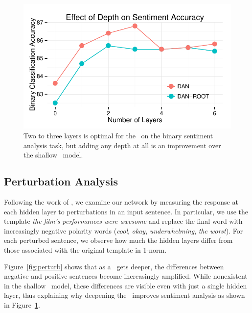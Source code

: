 \begin{figure}[t!]
\includegraphics[scale=0.6]{2015_acl_dan/figures/layers.pdf}
  \caption{Two to three layers is optimal for the \dan\ on the  binary sentiment
          analysis task, but adding any depth at all is an improvement over the
          shallow \nbow\ model.}
\label{fig:slayers}
\end{figure}









\subsection{Perturbation Analysis}

Following the work of , we examine our network by measuring
the response at each hidden layer to perturbations in an input sentence. In
particular, we use the template \emph{the film's performances were awesome} and
replace the final word with increasingly negative polarity words (\emph{cool},
\emph{okay}, \emph{underwhelming}, \emph{the worst}). For each perturbed
sentence, we observe how much the hidden layers differ from those associated
with the original template in 1-norm.

Figure~\ref{fig:perturb} shows that as a \dan\ gets deeper, the differences
between negative and positive sentences become increasingly amplified. While
nonexistent in the shallow \nbow\ model, these differences are visible even with
just a single hidden layer, thus explaining why deepening the \nbow\ improves
sentiment analysis as shown in Figure~\ref{fig:slayers}.

